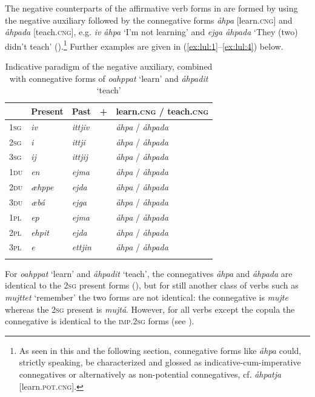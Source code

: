 \documentclass[output=paper,colorlinks,citecolor=brown]{langscibook}
\begin{document}
The negative counterparts of the affirmative verb forms in  are formed by using the negative auxiliary followed by the connegative forms \textit{åhpa} [learn\textsc{.cng}] and \textit{åhpada} [teach\textsc{.cng}], e.g. \textit{iv åhpa} ‘I’m not learning’ and \textit{ejga åhpada} ‘They (two) didn’t teach’ ().\footnote{As seen in this and the following section, connegative forms like \textit{åhpa} could, strictly speaking, be characterized and glossed as indicative-cum-imperative connegatives or alternatively as non-potential connegatives, cf. \textit{åhpatja} [learn.\textsc{pot.cng}].} Further examples are given in (\ref{ex:lul:1}--\ref{ex:lul:4}) below.

\begin{table}
\begin{tabularx}{.7\textwidth}{llllX}
\lsptoprule
& {Present} & {Past} & {+} & {learn\textsc{.cng} \textsc{/} teach\textsc{.cng}}\\
\midrule
{\scshape 1sg} & {\itshape iv} & {\itshape ittjiv} &  & {\textit{åhpa} / \textit{åhpada}}\\
{\textsc{2sg}} & {\textit{i}} & {\textit{ittji}} &  & {\textit{åhpa} / \textit{åhpada}}\\
{\textsc{3sg}} & {\textit{ij}} & {\textit{ittjij}} &  & {\textit{åhpa} / \textit{åhpada}}\\
{\textsc{1du}} & {\textit{en}} & {\textit{ejma}} &  & {\textit{åhpa} / \textit{åhpada}}\\
{\textsc{2du}} & {\textit{æhppe}} & {\textit{ejda}} &  & {\textit{åhpa} / \textit{åhpada}}\\
{\textsc{3du}} & {\textit{æbá}} & {\textit{ejga}} &  & {\textit{åhpa} / \textit{åhpada}}\\
{\textsc{1pl}} & {\textit{ep}} & {\textit{ejma}} &  & {\textit{åhpa} / \textit{åhpada}}\\
{\textsc{2pl}} & {\textit{ehpit}} & {\textit{ejda}} &  & {\textit{åhpa} / \textit{åhpada}}\\
{\textsc{3pl}} & {\textit{e}} & {\textit{ettjin}} &  & {\textit{åhpa} / \textit{åhpada}}\\
\lspbottomrule
\end{tabularx}
   \caption{Indicative paradigm of the negative auxiliary, combined with connegative forms of \textit{oahppat} ‘learn’ and \textit{åhpadit} ‘teach’}
    \label{tab:lul:2}
\end{table}

For \textit{oahppat} ‘learn’ and \textit{åhpadit} ‘teach’, the connegatives \textit{åhpa} and \textit{åhpada} are identical to the \textsc{2sg} present forms (), but for still another class of verbs such as \textit{mujttet} ‘remember’ the two forms are not identical: the connegative is \textit{mujte} whereas the \textsc{2sg} present is \textit{mujtá}. However, for all verbs except the copula the connegative is identical to the \textsc{imp.2sg} forms (see ).
\end{document}
